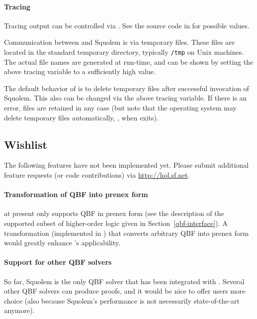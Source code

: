 \paragraph{Tracing}

Tracing output can be controlled via .  See the source code in  for possible
values.

Communication between \HOL{} and Squolem is via temporary files.
These files are located in the standard temporary directory, typically
{\tt /tmp} on Unix machines.  The actual file names are generated at
run-time, and can be shown by setting the above tracing variable to a
sufficiently high value.

The default behavior of  is to delete temporary files
after successful invocation of Squolem.  This also can be changed via
the above tracing variable.  If there is an error, files are retained
in any case (but note that the operating system may delete temporary
files automatically, \eg, when \HOL{} exits).

\subsection{Wishlist}

The following features have not been implemented yet.  Please submit
additional feature requests (or code contributions) via
\url{http://hol.sf.net}.

\paragraph{Transformation of QBF into prenex form}

 at present only supports QBF in prenex form (see the
description of the supported subset of higher-order logic given in
Section~\ref{qbf-interface}).  A transformation (implemented in \HOL)
that converts arbitrary QBF into prenex form would greatly enhance
's applicability.

\paragraph{Support for other QBF solvers}

So far, Squolem is the only QBF solver that has been integrated with
\HOL.  Several other QBF solvers can produce proofs, and it would be
nice to offer \HOL{} users more choice (also because Squolem's
performance is not necessarily state-of-the-art anymore).

